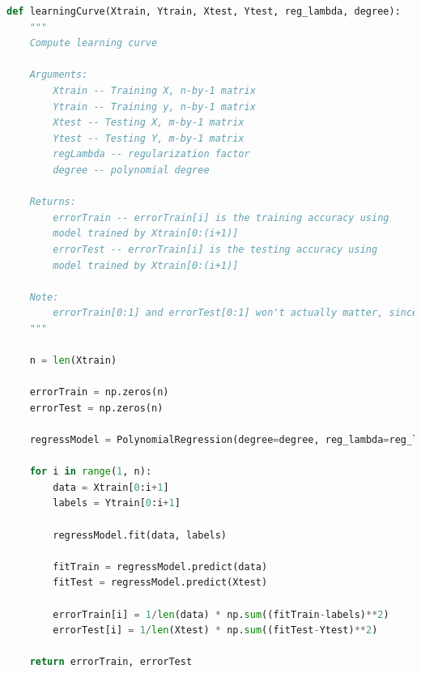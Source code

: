 \documentclass{article}
\newcommand{\1}{\mathbf{1}}
\begin{document}
\begin{lstlisting}[language=Python]
def learningCurve(Xtrain, Ytrain, Xtest, Ytest, reg_lambda, degree):
    """
    Compute learning curve

    Arguments:
        Xtrain -- Training X, n-by-1 matrix
        Ytrain -- Training y, n-by-1 matrix
        Xtest -- Testing X, m-by-1 matrix
        Ytest -- Testing Y, m-by-1 matrix
        regLambda -- regularization factor
        degree -- polynomial degree

    Returns:
        errorTrain -- errorTrain[i] is the training accuracy using
        model trained by Xtrain[0:(i+1)]
        errorTest -- errorTrain[i] is the testing accuracy using
        model trained by Xtrain[0:(i+1)]

    Note:
        errorTrain[0:1] and errorTest[0:1] won't actually matter, since we start displaying the learning curve at n = 2 (or higher)
    """

    n = len(Xtrain)

    errorTrain = np.zeros(n)
    errorTest = np.zeros(n)

    regressModel = PolynomialRegression(degree=degree, reg_lambda=reg_lambda)

    for i in range(1, n):
        data = Xtrain[0:i+1]
        labels = Ytrain[0:i+1]

        regressModel.fit(data, labels)

        fitTrain = regressModel.predict(data)
        fitTest = regressModel.predict(Xtest)

        errorTrain[i] = 1/len(data) * np.sum((fitTrain-labels)**2)
        errorTest[i] = 1/len(Xtest) * np.sum((fitTest-Ytest)**2)

    return errorTrain, errorTest
\end{lstlisting}




\newpage
\end{document}
